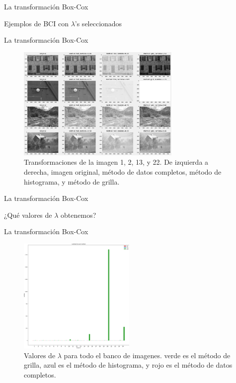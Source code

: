 \documentclass{beamer}
\begin{document}
\begin{frame}{La transformación Box-Cox}
    \begin{center}
        {\Large Ejemplos de BCI con $\lambda$'s seleccionados}
    \end{center}
\end{frame}

\begin{frame}{La transformación Box-Cox}
    \begin{figure}[H]
        \centering
        \includegraphics[width=0.7\textwidth]{img_bci_all.png}
        \caption{Transformaciones de la imagen 1, 2, 13, y 22. De izquierda a derecha, imagen original, m\'etodo de datos completos, m\'etodo de histograma, y m\'etodo de grilla.}
        \label{fig:img_bci_all}
    \end{figure}
\end{frame}

\begin{frame}{La transformación Box-Cox}
    \begin{center}
        {\Large ¿Qué valores de $\lambda$ obtenemos?}
    \end{center}
\end{frame}


\begin{frame}{La transformación Box-Cox}
    \begin{figure}[H]
        \centering
        \includegraphics[width=0.5\textwidth]{lambda_noclip.png}
        \caption{Valores de $\lambda$ para todo el banco de imagenes. verde es el m\'etodo de grilla, azul es el m\'etodo de histograma, y rojo es el m\'etodo de datos completos.}
        \label{fig:lambda_noclip}
    \end{figure}
\end{frame}
\end{document}
